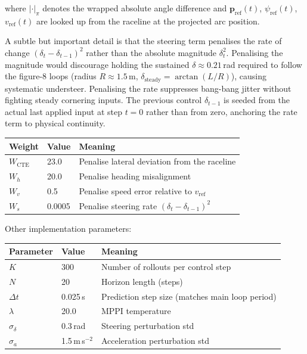 \documentclass[11pt]{article}
\begin{document}
where $|\cdot|_\pi$ denotes the wrapped absolute angle difference and
$\bm{p}_{\text{ref}}(t)$, $\psi_{\text{ref}}(t)$, $v_{\text{ref}}(t)$ are
looked up from the raceline at the projected arc position.

A subtle but important detail is that the steering term penalises the
rate of change $(\delta_t - \delta_{t-1})^2$ rather than the absolute
magnitude $\delta_t^2$.  Penalising the magnitude would discourage holding
the sustained $\delta \approx 0.21$\,rad required to follow the figure-8 loops
(radius $R \approx 1.5$\,m, $\delta_{\text{steady}} = \arctan(L/R)$), causing
systematic understeer.  Penalising the rate suppresses bang-bang jitter
without fighting steady cornering inputs.  The previous control $\delta_{t-1}$
is seeded from the actual last applied input at step $t=0$ rather than from
zero, anchoring the rate term to physical continuity.

\medskip
\begin{center}
\begin{tabular}{lll}
\toprule
Weight & Value & Meaning \\
\midrule
$W_{\text{CTE}}$ & 23.0   & Penalise lateral deviation from the raceline \\
$W_h$            & 20.0   & Penalise heading misalignment \\
$W_v$            & 0.5    & Penalise speed error relative to $v_{\text{ref}}$ \\
$W_s$            & 0.0005 & Penalise steering rate $(\delta_t - \delta_{t-1})^2$ \\
\bottomrule
\end{tabular}
\end{center}

Other implementation parameters:

\medskip
\begin{center}
\begin{tabular}{lll}
\toprule
Parameter & Value & Meaning \\
\midrule
$K$              & 300    & Number of rollouts per control step \\
$N$              & 20     & Horizon length (steps) \\
$\Delta t$       & 0.025\,s & Prediction step size (matches main loop period) \\
$\lambda$        & 20.0   & MPPI temperature \\
$\sigma_\delta$  & 0.3\,rad & Steering perturbation std \\
$\sigma_a$       & 1.5\,m\,s$^{-2}$ & Acceleration perturbation std \\
\bottomrule
\end{tabular}
\end{center}
\end{document}

